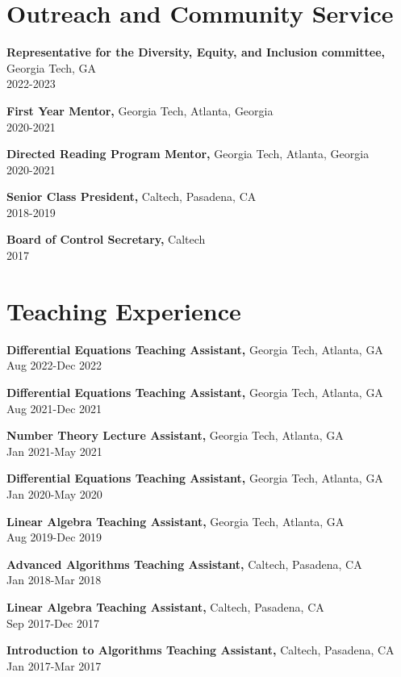 \documentclass[margin]{res}
\begin{document}
\begin{resume}
\section{Outreach and Community Service} 
       {\bf Representative for the Diversity, Equity, and Inclusion committee,} Georgia Tech, GA    \\         2022-2023

       {\bf First Year Mentor,} Georgia Tech, Atlanta, Georgia     \\         2020-2021 

       {\bf Directed Reading Program Mentor,} Georgia Tech, Atlanta, Georgia     \\         2020-2021 

       {\bf Senior Class President,} Caltech, Pasadena, CA    \\         2018-2019 

		{\bf Board of Control Secretary,} Caltech \\   2017

\section{Teaching Experience}
{\bf Differential Equations Teaching Assistant,} Georgia Tech, Atlanta, GA \\ Aug 2022-Dec 2022

{\bf Differential Equations Teaching Assistant,} Georgia Tech, Atlanta, GA \\ Aug 2021-Dec 2021

{\bf Number Theory Lecture Assistant,} Georgia Tech, Atlanta, GA \\ Jan 2021-May 2021

{\bf Differential Equations Teaching Assistant,} Georgia Tech, Atlanta, GA \\ Jan 2020-May 2020

{\bf Linear Algebra Teaching Assistant,} Georgia Tech, Atlanta, GA \\ Aug 2019-Dec 2019

{\bf Advanced Algorithms Teaching Assistant,} Caltech, Pasadena, CA \\ Jan 2018-Mar 2018

{\bf Linear Algebra Teaching Assistant,} Caltech, Pasadena, CA \\ Sep 2017-Dec 2017

{\bf Introduction to Algorithms Teaching Assistant,} Caltech, Pasadena, CA \\ Jan 2017-Mar 2017


\end{resume}
\end{document}
